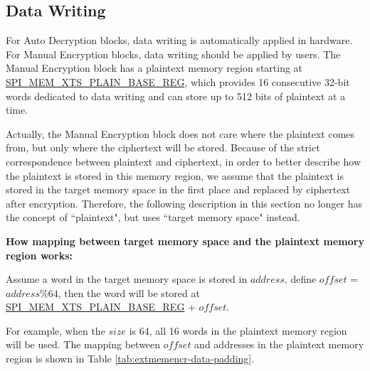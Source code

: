\documentclass[main\_\_EN.tex]{subfiles}
\begin{document}
\subsection{Data Writing}
\label{sec:extmemncr-data-writing}

For Auto Decryption blocks, data writing is automatically applied in hardware. For Manual Encryption blocks, data writing should be applied by users. The Manual Encryption block has a plaintext memory region starting at \hyperref[regdesc:SPIMEMXTSPLAINBASEREG]{SPI\_MEM\_XTS\_PLAIN\_BASE\_REG}, which provides 16 consecutive 32-bit words dedicated to data writing and can store up to 512 bits of plaintext at a time.

Actually, the Manual Encryption block does not care where the plaintext comes from, but only where the ciphertext will be stored. Because of the strict correspondence between plaintext and ciphertext, in order to better describe how the plaintext is stored in this memory region, we assume that the plaintext is stored in the target memory space in the first place and replaced by ciphertext after encryption. Therefore, the following description in this section no longer has the concept of ``plaintext", but uses ``target memory space" instead.

{\bfseries How mapping between target memory space and the plaintext memory region works:}

Assume a word in the target memory space is stored in \begin{math} address \end{math}, define \begin{math}offset\end{math} = \begin{math} address \% 64 \end{math}, then the word will be stored at \hyperref[regdesc:SPIMEMXTSPLAINBASEREG]{SPI\_MEM\_XTS\_PLAIN\_BASE\_REG} + \begin{math}offset\end{math}.

For example, when the \begin{math} size \end{math} is 64, all 16 words in the plaintext memory region will be used. The mapping between \begin{math}offset\end{math} and addresses in the plaintext memory region is shown in Table \ref{tab:extmemencr-data-padding}.


\end{document}
